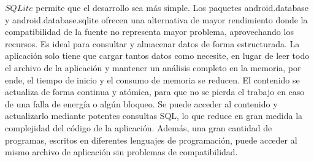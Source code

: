 $SQLite$ permite que el desarrollo sea más simple. Los paquetes android.database y android.database.sqlite ofrecen una alternativa de mayor rendimiento donde la compatibilidad de la fuente no representa mayor problema, aprovechando los recursos. Es ideal para consultar y almacenar datos de forma estructurada. La aplicación solo tiene que cargar tantos datos como necesite, en lugar de leer todo el archivo de la aplicación y mantener un análisis completo en la memoria, por ende, el tiempo de inicio y el consumo de memoria se reducen. El contenido se actualiza de forma continua y atómica, para que no se pierda el trabajo en caso de una falla de energía o algún bloqueo. Se puede acceder al contenido y actualizarlo mediante potentes consultas SQL, lo que reduce en gran medida la complejidad del código de la aplicación. Además, una gran cantidad de programas, escritos en diferentes lenguajes de programación, puede acceder al mismo archivo de aplicación sin problemas de compatibilidad.


